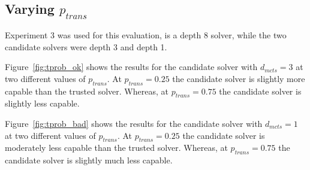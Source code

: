\subsection{Varying $p_{trans}$}
Experiment 3 was used for this evaluation, \solverstar{} is a depth 8 solver, while the two candidate solvers were depth 3 and depth 1.

Figure~\ref{fig:tprob_ok} shows the results for the candidate solver with $d_{mcts}=3$ at two different values of $p_{trans}$. At $p_{trans}=0.25$ the candidate solver is slightly more capable than the trusted solver. Whereas, at $p_{trans}=0.75$ the candidate solver is slightly less capable.

Figure~\ref{fig:tprob_bad} shows the results for the candidate solver with $d_{mcts}=1$ at two different values of $p_{trans}$. At $p_{trans}=0.25$ the candidate solver is moderately less capable than the trusted solver. Whereas, at $p_{trans}=0.75$ the candidate solver is slightly much less capable.

